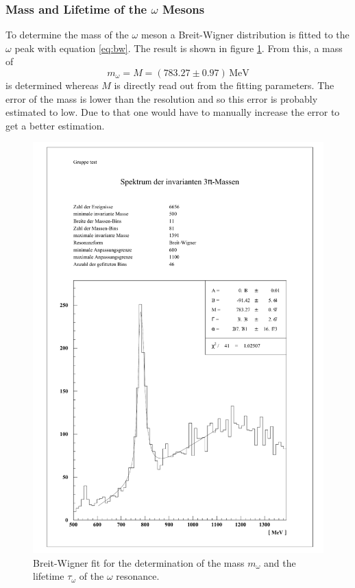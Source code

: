 \documentclass[10pt, a4paper, notitlepage, DIV=15]{scrartcl}
\begin{document}
\subsubsection{Mass and Lifetime of the $\omega$ Mesons}
To determine the mass of the $\omega$ meson a Breit-Wigner distribution is fitted to the $\omega$ peak with equation \ref{eq:bw}. The result is shown in figure \ref{fig:omega_bw}. From this, a mass of 
\begin{equation}
	m_\omega=M=(783.27\pm0.97)\,\text{MeV}
\end{equation}
is determined whereas $M$ is directly read out from the fitting parameters. The error of the mass is lower than the resolution and so this error is probably estimated to low. Due to that one would have to manually increase the error to get a better estimation.
\begin{figure}[h]
	\centering
	\includegraphics[width=1\textwidth]{omega_bw}
	\caption{Breit-Wigner fit for the determination of the mass $m_\omega$ and the lifetime $\tau_\omega$ of the $\omega$ resonance.}
	\label{fig:omega_bw}
\end{figure}
\end{document}
